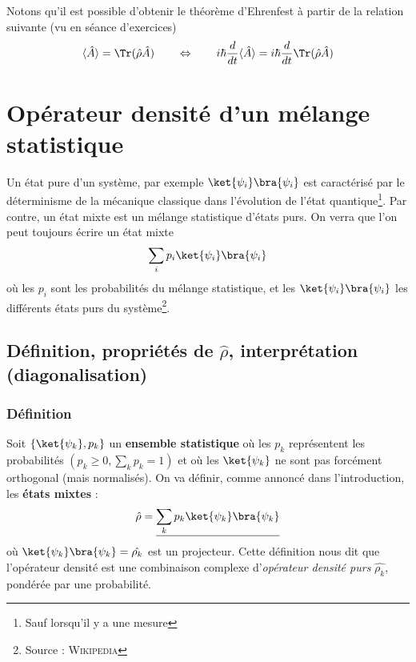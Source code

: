 Notons qu'il est possible d'obtenir le théorème d'Ehrenfest à partir de la relation suivante (vu en séance d'exercices)
\begin{equation}
\langle\hat{A}\rangle = \Tr(\hat{\rho}\hat{A})\qquad\Leftrightarrow\qquad i\hbar\frac{d}{dt}\langle\hat{A}\rangle = 
i\hbar\frac{d}{dt}\Tr(\hat{\rho}\hat{A})
\end{equation}



\newpage
	
\section{Opérateur densité d'un mélange statistique}
Un état pure d'un système, par exemple $\ket{\psi_i}\bra{\psi_i}$ est caractérisé par le déterminisme de la 
mécanique classique dans l'évolution de l'état quantique\footnote{Sauf lorsqu'il y a une mesure}. Par contre, 
un état mixte est un mélange statistique d'états purs. On verra que l'on peut toujours écrire un état mixte 
\begin{equation}
\sum_i p_i\ket{\psi_i}\bra{\psi_i}
\end{equation}
où les $p_i$ sont les probabilités du mélange statistique, et les $\ket{\psi_i}\bra{\psi_i}$ les différents 
états purs du système\footnote{Source : \textsc{Wikipedia}}.

\subsection{Définition, propriétés de $\hat{\rho}$, interprétation (diagonalisation)}
\subsubsection{Définition}	
Soit $\{\ket{\psi_k},p_k\}$ un \textbf{ensemble statistique} où les $p_k$ représentent les probabilités $\left(p_k \geq 0, 
\sum_k p_k=1\right)$ et où les $\ket{\psi_k}$ ne sont pas forcément orthogonal (mais normalisés). On va définir, comme 
annoncé dans l'introduction, les \textbf{états mixtes} :
\begin{equation}
\hat{\rho} = \underline{\sum_k p_k\ket{\psi_k}\bra{\psi_k}}
\label{eq:DefRho2}
\end{equation}
où $\ket{\psi_k}\bra{\psi_k} = \hat{\rho_k}$ est un projecteur. Cette définition nous dit que l'opérateur densité 
est une combinaison complexe d'\textit{opérateur densité purs} $\hat{\rho_k}$, pondérée par une probabilité.

